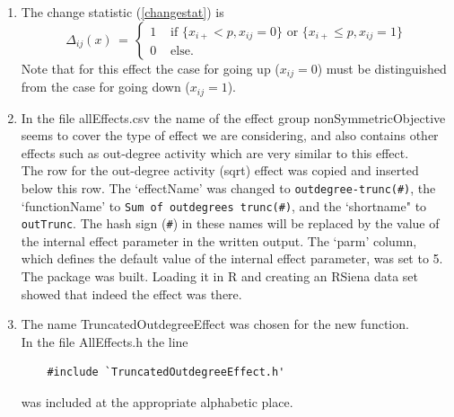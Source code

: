 \documentclass[a4paper,fleqn,11pt]{article}
\newcommand{\+}{\, + \,}
\newcommand{\sfn}[1]{\textsf{#1}}
\newcommand{\R}{{\sf R }}
\newcommand{\RS}{{\sf \textsf{RSiena} }}
\begin{document}
\begin{enumerate}
\item The change statistic (\ref{changestat}) is
      \begin{equation}
       \Delta_{ij}(x) \,=\, \left\{ \begin{array}{ll}
                   1 & \text{  if } \{x_{i+} < p,  x_{ij} = 0 \}
                     \text{ or } \{x_{i+} \leq p,  x_{ij} = 1 \} \\
                   0 & \text{  else. }
                   \end{array}         \right.  \label{outTrunc_cs}
      \end{equation}
      Note that for this effect the case for going up ($x_{ij} = 0$)
      must be distinguished from the case
      for going down ($x_{ij} = 1$).
\item In the file \textsf{allEffects.csv} the name of the
      effect group \textsf{nonSymmetricObjective} seems to cover the
      type of effect we are considering, and also contains other effects
      such as out-degree activity which are very similar to this
      effect.\\
      The row for the out-degree activity (sqrt) effect was copied
      and inserted below this row. The `effectName' was changed to
      \texttt{outdegree-trunc(\#)}, the `functionName' to
      \texttt{Sum of outdegrees trunc(\#)},
      and the `shortname" to \texttt{outTrunc}.
      The hash sign (\texttt{\#}) in these names will be replaced
      by the value of the
      internal effect parameter in the written output.
      The `parm' column, which defines
      the default value of the internal effect parameter, was set to 5.
      \\
      The package was built. Loading it in \R and creating an
      \RS data set showed that indeed the effect was there.
\item The name \sfn{TruncatedOutdegreeEffect} was chosen for the new function.\\
      In the file \textsf{AllEffects.h} the line
      \begin{verbatim}
    #include `TruncatedOutdegreeEffect.h'
      \end{verbatim}
      was included at the appropriate alphabetic place.


\end{enumerate}
\end{document}
